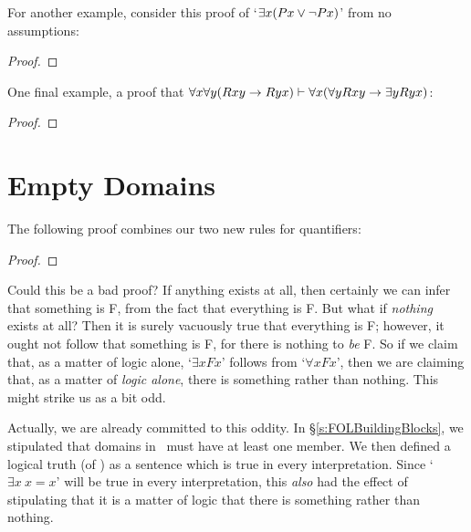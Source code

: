 For another example, consider this proof of `$\exists x (Px \vee \neg Px)$' from no assumptions:\label{exexmid}
\begin{proof}
	\open{}
	\open{}
	\close
	\close
\end{proof}
One final example, a proof that $\forall x \forall y (Rxy \rightarrow Ryx) \vdash \forall x (\forall y Rxy \rightarrow \exists y Ryx)$:
 \begin{proof}
        \open
            \close
    \end{proof}


\section{Empty Domains}
The following proof combines our two new rules for quantifiers:
	\begin{proof}
	\end{proof}
Could this be a bad proof? If anything exists at all, then certainly we can infer that something is F, from the fact that everything is F. But what if \emph{nothing} exists at all? Then it is surely vacuously true that everything is F; however, it ought not follow that something is F, for there is nothing to \emph{be} F. So if we claim that, as a matter of logic alone, `$\exists x Fx$' follows from `$\forall x Fx$', then we are claiming that, as a matter of \emph{logic alone}, there is something rather than nothing. This might strike us as a bit odd.

Actually, we are already committed to this oddity. In §\ref{s:FOLBuildingBlocks}, we stipulated that domains in \FOL\ must have at least one member. We then defined a logical truth (of \FOL) as a sentence which is true in every interpretation. Since `$\exists x\ x=x$' will be true in every interpretation, this \emph{also} had the effect of stipulating that it is a matter of logic that there is something rather than nothing.

